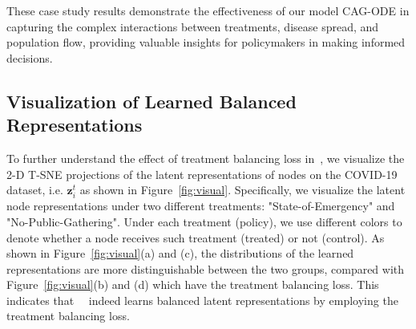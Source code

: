 These case study results demonstrate the effectiveness of our model CAG-ODE in capturing the complex interactions between treatments, disease spread, and population flow, providing valuable insights for policymakers in making informed decisions.






\subsection{Visualization of Learned Balanced Representations}\label{sec:appendix_visual}
To further understand the effect of treatment balancing loss in~\model, we visualize the 2-D T-SNE projections of the latent representations of nodes on the COVID-19 dataset, i.e. $\bm{z}_i^t$ as shown in Figure~\ref{fig:visual}. Specifically, we visualize the latent node representations under two different treatments: "State-of-Emergency" and "No-Public-Gathering". Under each treatment (policy), we use different colors to denote whether a node receives such treatment (treated) or not (control). As shown in Figure~\ref{fig:visual}(a) and (c), the distributions of the learned representations are more distinguishable between the two groups, compared with Figure~\ref{fig:visual}(b) and (d) which have the treatment balancing loss. This indicates that~\model~ indeed learns balanced latent representations by employing the treatment balancing loss.





